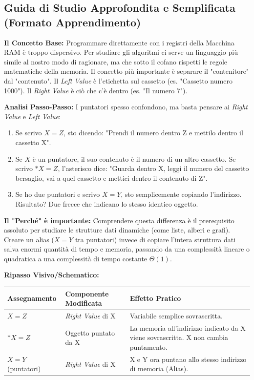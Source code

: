\documentclass[a4paper, 11pt]{report}
\begin{document}
\vspace{0.5cm}
\subsection*{Guida di Studio Approfondita e Semplificata (Formato Apprendimento)}


\textbf{Il Concetto Base:}
Programmare direttamente con i registri della Macchina RAM è troppo dispersivo. Per studiare gli algoritmi ci serve un linguaggio più simile al nostro modo di ragionare, ma che sotto il cofano rispetti le regole matematiche della memoria. Il concetto più importante è separare il "contenitore" dal "contenuto". Il \textit{Left Value} è l'etichetta sul cassetto (es. "Cassetto numero 1000"). Il \textit{Right Value} è ciò che c'è dentro (es. "Il numero 7").

\textbf{Analisi Passo-Passo:}
I puntatori spesso confondono, ma basta pensare ai \textit{Right Value} e \textit{Left Value}:
\begin{enumerate}
\item Se scrivo $X = Z$, sto dicendo: "Prendi il numero dentro Z e mettilo dentro il cassetto X".
\item Se $X$ è un puntatore, il suo contenuto è il numero di un altro cassetto. Se scrivo $*X = Z$, l'asterisco dice: "Guarda dentro X, leggi il numero del cassetto bersaglio, vai a quel cassetto e mettici dentro il contenuto di Z".
\item Se ho due puntatori e scrivo $X = Y$, sto semplicemente copiando l'indirizzo. Risultato? Due frecce che indicano lo stesso identico oggetto.
\end{enumerate}

\textbf{Il "Perché" è importante:}
Comprendere questa differenza è il prerequisito assoluto per studiare le strutture dati dinamiche (come liste, alberi e grafi). Creare un alias ($X=Y$ tra puntatori) invece di copiare l'intera struttura dati salva enormi quantità di tempo e memoria, passando da una complessità lineare o quadratica a una complessità di tempo costante $\Theta(1)$.

\textbf{Ripasso Visivo/Schematico:}
\begin{center}
\begin{tabular}{|l|l|p{7cm}|}
\hline
\textbf{Assegnamento} & \textbf{Componente Modificata} & \textbf{Effetto Pratico} \\
\hline
$X = Z$ & \textit{Right Value} di X & Variabile semplice sovrascritta. \\
\hline
$*X = Z$ & Oggetto puntato da X & La memoria all'indirizzo indicato da X viene sovrascritta. X non cambia puntamento. \\
\hline
$X = Y$ (puntatori) & \textit{Right Value} di X & X e Y ora puntano allo stesso indirizzo di memoria (Alias). \\
\hline
\end{tabular}
\end{center}
\end{document}
